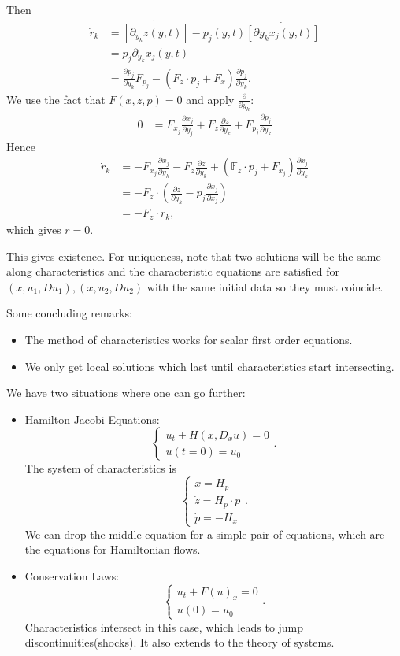 \documentclass[12pt]{scrartcl}
\newcommand{\F}{\mathbb{F}}
\begin{document}
Then 
\begin{align*}
\dot r_k &= \dot{[\partial_{y_k}z(y, t)]} - p_j(y, t)\dot{[\partial y_k x_j(y, t)]}\\
&=p_j \partial_{y_k}x_j(y, t)\\
&= \frac{\partial p_j}{\partial y_k} F_{p_j} - (F_z \cdot p_j + F_x) \frac{\partial p_j}{\partial y_k}.
\end{align*}
We use the fact that $F(x, z, p) = 0$ and apply $\frac{\partial}{\partial y_k}$:
\begin{align*}
0 &=F_{x_j} \frac{\partial x_j}{\partial y_j} + F_z \frac{\partial z}{\partial y_k} + F_{p_j} \frac{\partial p_j}{\partial y_k}
\end{align*}
Hence 
\begin{align*}
\dot r_k &= - F_{x_j} \frac{\partial x_j}{\partial y_k} - F_z \frac{\partial z}{\partial y_k} + (\F_z\cdot p_j + F_{x_j})\frac{\partial x_j}{\partial y_k} \\
&= -F_z\cdot \left (\frac{\partial z}{\partial y_k} - p_j\frac{\partial x_j}{\partial x_j}\right )\\
&= -F_z \cdot r_k,
\end{align*}
which gives $r=0$.

This gives existence.  For uniqueness, note that two solutions will be the same along characteristics and the characteristic equations are satisfied for $(x, u_1, Du_1), (x, u_2, Du_2)$ with the same initial data so they must coincide.

Some concluding remarks:
\begin{itemize}
\item The method of characteristics works for scalar first order equations.
\item We only get local solutions which last until characteristics start intersecting.
\end{itemize}

We have two situations where one can go further:
\begin{itemize}
\item Hamilton-Jacobi Equations:
$$\begin{cases}
u_t + H(x, D_xu) = 0\\
u(t=0) = u_0
\end{cases}.
$$The system of characteristics is 
$$\begin{cases}
\dot x = H_p \\
\dot z = H_p \cdot p \\
\dot p = -H_x
\end{cases}.$$
We can drop the middle equation for a simple pair of equations, which are the equations for Hamiltonian flows.
\item Conservation Laws:
$$\begin{cases}
u_t + F(u)_x= 0\\
u(0) = u_0
\end{cases}.
$$
Characteristics intersect in this case, which leads to jump discontinuities(shocks).  It also extends to the theory of systems.
\end{itemize}
\pagebreak
\end{document}
